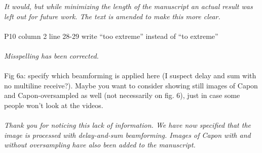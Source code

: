 \documentclass{article}
\begin{document}
\textit{It would, but while minimizing the length of the manuscript an actual result was left out for future work. The text is amended to make this more clear.}
\\\\
P10 column 2 line 28-29 write “too extreme” instead of “to extreme”
\\\\
\textit{Misspelling has been corrected.}
\\\\
Fig 6a: specify which beamforming is applied here (I suspect delay and sum with no multiline receive?). Maybe you want to consider showing still images of Capon and Capon-oversampled as well (not necessarily on fig. 6), just in case some people won’t look at the videos.
\\\\
\textit{Thank you for noticing this lack of information. We have now specified that the image is processed with delay-and-sum beamforming. Images of Capon with and without oversampling have also been added to the manuscript.}
\end{document}
